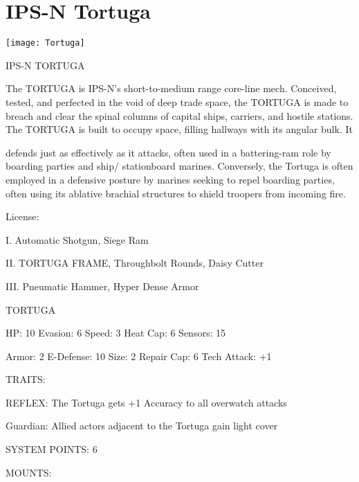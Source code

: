 \section{IPS-N Tortuga}

\begin{center}
    \texttt{[image: Tortuga]}
\end{center}

                                                   IPS-N TORTUGA

The TORTUGA is IPS-N’s short-to-medium range core-line mech. Conceived, tested, and perfected in the
void of deep trade space, the TORTUGA is made to breach and clear the spinal columns of capital ships,
carriers, and hostile stations. The TORTUGA is built to occupy space, filling hallways with its angular bulk. It




defends just as effectively as it attacks, often used in a battering-ram role by boarding parties and ship/
stationboard marines. Conversely, the Tortuga is often employed in a defensive posture by marines seeking
to repel boarding parties, often using its ablative brachial structures to shield troopers from incoming fire.

                                                   License:

I. Automatic Shotgun, Siege Ram

II. TORTUGA FRAME, Throughbolt Rounds, Daisy Cutter

III. Pneumatic Hammer, Hyper Dense Armor


                                                 TORTUGA

  HP: 10         Evasion: 6                            Speed: 3           Heat Cap: 6        Sensors: 15

  Armor: 2       E-Defense: 10                         Size: 2            Repair Cap: 6      Tech Attack:
                                                                                             +1

                                                   TRAITS:

  REFLEX: The Tortuga gets +1 Accuracy to all overwatch attacks

  Guardian: Allied actors adjacent to the Tortuga gain light cover

                                             SYSTEM POINTS: 6

                                                   MOUNTS:


